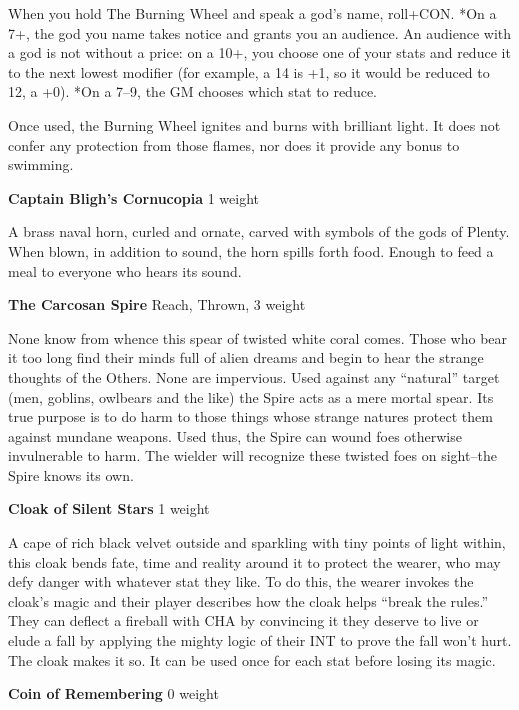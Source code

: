 When you hold The Burning Wheel and speak a god's name, roll+CON. *On a 7+, the god you name takes notice and grants you an audience. An audience with a god is not without a price: on a 10+, you choose one of your stats and reduce it to the next lowest modifier (for example, a 14 is +1, so it would be reduced to 12, a +0). *On a 7--9, the GM chooses which stat to reduce.

Once used, the Burning Wheel ignites and burns with brilliant light. It does not confer any protection from those flames, nor does it provide any bonus to swimming.

{\noindent \bfseries Captain Bligh's Cornucopia} \hspace*{\fill} 1 weight

A brass naval horn, curled and ornate, carved with symbols of the gods of Plenty. When blown, in addition to sound, the horn spills forth food. Enough to feed a meal to everyone who hears its sound.

{\noindent \bfseries The Carcosan Spire} \hspace*{\fill} Reach, Thrown, 3 weight

None know from whence this spear of twisted white coral comes. Those who bear it too long find their minds full of alien dreams and begin to hear the strange thoughts of the Others. None are impervious. Used against any ``natural'' target (men, goblins, owlbears and the like) the Spire acts as a mere mortal spear. Its true purpose is to do harm to those things whose strange natures protect them against mundane weapons. Used thus, the Spire can wound foes otherwise invulnerable to harm. The wielder will recognize these twisted foes on sight--the Spire knows its own.

{\noindent \bfseries Cloak of Silent Stars} \hspace*{\fill} 1 weight

A cape of rich black velvet outside and sparkling with tiny points of light within, this cloak bends fate, time and reality around it to protect the wearer, who may defy danger with whatever stat they like. To do this, the wearer invokes the cloak's magic and their player describes how the cloak helps ``break the rules.'' They can deflect a fireball with CHA by convincing it they deserve to live or elude a fall by applying the mighty logic of their INT to prove the fall won't hurt. The cloak makes it so. It can be used once for each stat before losing its magic.

{\noindent \bfseries Coin of Remembering} \hspace*{\fill} 0 weight

